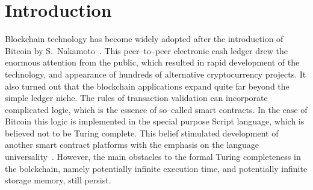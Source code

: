\documentclass[runningheads]{llncs}
\begin{document}
    \section{Introduction}
    Blockchain technology has become widely adopted after the introduction of
    Bitcoin by S.~Nakamoto~\cite{nakamoto2008bitcoin}. This peer--to--peer
    electronic cash ledger drew the enormous attention from the public, which
    resulted in rapid development of the technology, and appearance of hundreds
    of alternative cryptocurrency projects. It also turned out that the
    blockchain applications expand quite far beyond the simple ledger niche. The
    rules of transaction validation can incorporate complicated logic, which is
    the essence of so--called smart contracts. In the case of Bitcoin this logic
    is implemented in the special purpose Script language, which is believed not
    to be Turing complete. This belief stimulated development of another smart
    contract platforms with the emphasis on the language
    universality~\cite{buterin2014next}. However, the main obstacles to the
    formal Turing completeness in the bolckchain, namely potentially infinite
    execution time, and potentially infinite storage memory, still persist.
\end{document}
